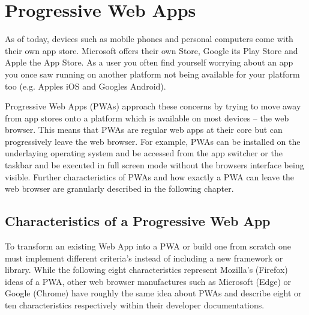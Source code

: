 \section{Progressive Web Apps}
\label{sec:theorieC}


As of today, devices such as mobile phones and personal computers come with their own app store. Microsoft offers their own Store, Google its Play Store and Apple the App Store. As a user you often find yourself worrying about an app you once saw running on another platform not being available for your platform too (e.g. Apples iOS and Googles Android). \cite[p. 3]{sheppardBeginningProgressiveWeb2017}

Progressive Web Apps (PWAs) approach these concerns by trying to move away from app stores onto a platform which is available on most devices – the web browser. This means that PWAs are regular web apps at their core but can progressively leave the web browser. For example, PWAs can be installed on the underlaying operating system and be accessed from the app switcher or the taskbar and be executed in full screen mode without the browsers interface being visible. \cite[p. 26]{liebelProgressiveWebApps2019} Further characteristics of PWAs and how exactly a PWA can leave the web browser are granularly described in the following chapter.


\subsection{Characteristics of a Progressive Web App}
\label{sec:theorieCa}


To transform an existing Web App into a PWA or build one from scratch one must implement different criteria’s instead of including a new framework or library. \cite[p. 6]{sheppardBeginningProgressiveWeb2017}
While the following eight characteristics represent Mozilla’s (Firefox) ideas of a PWA, other web browser manufactures such as Microsoft (Edge) or Google (Chrome) have roughly the same idea about PWAs and describe eight or ten characteristics respectively within their developer documentations. \cite[p. 90]{liebelProgressiveWebApps2019}\cite{ProgressiveWebApps}

